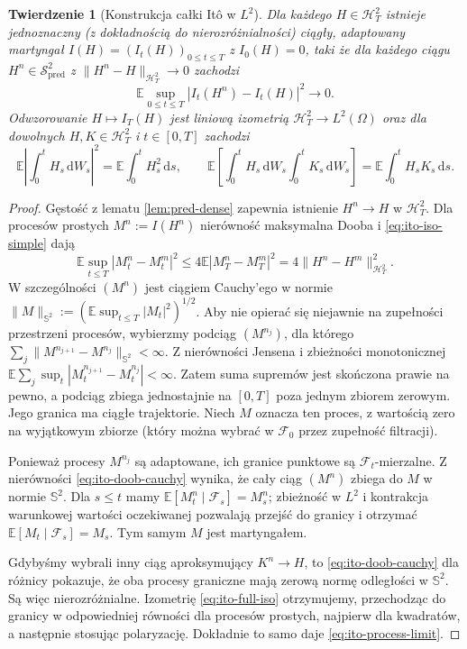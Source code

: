 \documentclass[11pt,a4paper,oneside]{report}
\numberwithin{equation}{chapter}
\theoremstyle{plain}
\newtheorem{twierdzenie}{Twierdzenie}[chapter]
\theoremstyle{definition}
\theoremstyle{remark}
\newcommand{\E}{\mathbb{E}}
\newcommand{\calF}{\mathcal{F}}
\newcommand{\calH}{\mathcal{H}}
\newcommand{\calS}{\mathcal{S}}
\newcommand{\dd}{\mathrm{d}}
\newcommand{\norm}[1]{\lVert #1\rVert}
\begin{document}
\begin{twierdzenie}[Konstrukcja całki Itô w $L^2$]\label{thm:volIII:02:02}\label{th:ito-extension}
Dla każdego $H\in\calH_T^2$ istnieje jednoznaczny
(z dokładnością do nierozróżnialności) ciągły,
adaptowany martyngał $I(H)=(I_t(H))_{0\le t\le T}$
z $I_0(H)=0$, taki że dla każdego ciągu
$H^n\in\calS_{\mathrm{pred}}^2$ z
$\norm{H^n-H}_{\calH_T^2}\to0$ zachodzi
\[
\E\sup_{0\le t\le T}|I_t(H^n)-I_t(H)|^2\longrightarrow0.
\tag{2.6}\label{eq:ito-process-limit}
\]
Odwzorowanie $H\mapsto I_T(H)$ jest liniową izometrią
$\calH_T^2\to L^2(\Omega)$ oraz dla dowolnych
$H,K\in\calH_T^2$ i $t\in[0,T]$ zachodzi
\[
\E\left|\int_0^tH_s\,\dd W_s\right|^2
=\E\int_0^tH_s^2\,\dd s,
\qquad
\E\left[\int_0^tH_s\,\dd W_s\int_0^tK_s\,\dd W_s\right]
=\E\int_0^tH_sK_s\,\dd s.
\tag{2.7}\label{eq:ito-full-iso}
\]
\end{twierdzenie}
\begin{proof}
Gęstość z lematu \ref{lem:pred-dense} zapewnia istnienie
$H^n\to H$ w $\calH_T^2$. Dla procesów prostych
$M^n:=I(H^n)$ nierówność maksymalna Dooba i
\eqref{eq:ito-iso-simple} dają
\[
\E\sup_{t\le T}|M_t^n-M_t^m|^2
\le4\E|M_T^n-M_T^m|^2
=4\norm{H^n-H^m}_{\calH_T^2}^2.
\tag{2.8}\label{eq:ito-doob-cauchy}
\]
W szczególności $(M^n)$ jest ciągiem Cauchy'ego
w normie $\norm{M}_{\mathbb S^2}:=(\E\sup_{t\le T}|M_t|^2)^{1/2}$.
Aby nie opierać się niejawnie na zupełności przestrzeni
procesów, wybierzmy podciąg $(M^{n_j})$, dla którego
$\sum_j\norm{M^{n_{j+1}}-M^{n_j}}_{\mathbb S^2}<\infty$.
Z nierówności Jensena i zbieżności monotonicznej
$\E\sum_j\sup_t|M_t^{n_{j+1}}-M_t^{n_j}|<\infty$.
Zatem suma supremów jest skończona prawie na pewno,
a podciąg zbiega jednostajnie na $[0,T]$ poza jednym
zbiorem zerowym. Jego granica ma ciągłe trajektorie.
Niech $M$ oznacza ten proces, z wartością zero na
wyjątkowym zbiorze (który można wybrać w $\calF_0$
przez zupełność filtracji).

Ponieważ procesy $M^{n_j}$ są adaptowane, ich granice
punktowe są $\calF_t$-mierzalne. Z nierówności
\eqref{eq:ito-doob-cauchy} wynika, że cały ciąg
$(M^n)$ zbiega do $M$ w normie $\mathbb S^2$.
Dla $s\le t$ mamy
$\E[M_t^n\mid\calF_s]=M_s^n$; zbieżność w $L^2$
i kontrakcja warunkowej wartości oczekiwanej pozwalają
przejść do granicy i otrzymać $\E[M_t\mid\calF_s]=M_s$.
Tym samym $M$ jest martyngałem.

Gdybyśmy wybrali inny ciąg aproksymujący $K^n\to H$,
to \eqref{eq:ito-doob-cauchy} dla różnicy pokazuje,
że oba procesy graniczne mają zerową normę odległości
w $\mathbb S^2$. Są więc nierozróżnialne.
Izometrię \eqref{eq:ito-full-iso} otrzymujemy,
przechodząc do granicy w odpowiedniej równości dla
procesów prostych, najpierw dla kwadratów, a następnie
stosując polaryzację. Dokładnie to samo daje
\eqref{eq:ito-process-limit}.
\end{proof}
\end{document}
